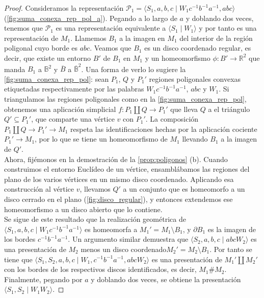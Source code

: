 \documentclass[10pt]{report}
\newcommand{\R}{\mathbb{R}}
\theoremstyle{definition}
\begin{document}
\begin{proof}
Consideramos la representación $\mathcal{P}_1=\langle S_1,a,b,c\mid W_1c^{-1}b^{-1}a^{-1},abc\rangle$ (\autoref{fig:suma_conexa_rep_pol_a}). Pegando a lo largo de $a$ y doblando dos veces, tenemos que $\mathcal{P}_1$ es una representación equivalente a $\langle S_1\mid W_1\rangle$ y por tanto es una representación de $M_1$. Llamemos $B_1$ a la imagen en $M_1$ del interior de la región poligonal cuyo borde es $abc$. Veamos que $B_1$ es un disco coordenado regular, es decir, que existe un entorno $B'$ de $B_1$ en $M_1$ y un homeomorfismo $\phi :B'\to \R^2$ que manda $B_1$ a $\mathbb{B}^2$ y $\overline{B}$ a $\overline{\mathbb{B}}^2$. Una forma de verlo lo sugiere la \autoref{fig:suma_conexa_rep_pol}: sean $P_1$, $Q$ y $P_1'$ regiones poligonales convexas etiquetadas respectivamente por las palabras $W_1c^{-1}b^{-1}a^{-1}$, $abc$ y $W_1$. Si triangulamos las regiones poligonales como en la  \autoref{fig:suma_conexa_rep_pol}, obtenemos una aplicación simplicial $f:P_1\amalg Q\to P_1'$ que lleva $Q$ a el triángulo $Q'\subseteq P_1'$, que comparte una vértice $v$ con $P_1'$. La composición $P_1\amalg Q\to P_1'\to M_1$ respeta las identificaciones hechas por la aplicación cociente $P_1'\to M_1$, por lo que se tiene un homeomorfismo de $M_1$ llevando $B_1$ a la imagen de $Q'$.\\
Ahora, fijémonos en la demostración de la \autoref{prop:poligonos} (b). Cuando construimos el entorno Euclídeo de un vértice, ensamblábamos las regiones del plano de los varios vértices en un mismo disco coordenado. Aplicando esa construcción al vértice $v$, llevamos $Q'$ a un conjunto que es homeomorfo a un disco cerrado en el plano (\autoref{fig:disco_regular}), y  entonces extendemos ese homeomorfismo a un disco abierto que lo contiene.\\
Se sigue de este resultado que la realización geométrica de $\langle S_1,a,b,c\mid W_1c^{-1}b^{-1}a^{-1}\rangle$ es homeomorfa a $M_1'=M_1\setminus B_1$, y $\partial B_1$ es la imagen de los bordes $c^{-1}b^{-1}a^{-1}$. Un argumento similar demuestra que $\langle S_2,a,b,c\mid abcW_2\rangle$ es una presentación de $M_2$ menos un disco coordenado$M_2'=M_2\setminus B_1$. Por tanto se tiene que $\langle S_1,S_2,a,b,c\mid W_1,c^{-1}b^{-1}a^{-1},abcW_2\rangle$ es una presentación de $M_1'\amalg M_2'$ con los bordes de los respectivos discos identificados, es decir, $M_1\# M_2$. Finalmente, pegando por $a$ y doblando dos veces, se obtiene la presentación $\langle S_1,S_2\mid W_1W_2\rangle$.
\end{proof}
\end{document}
